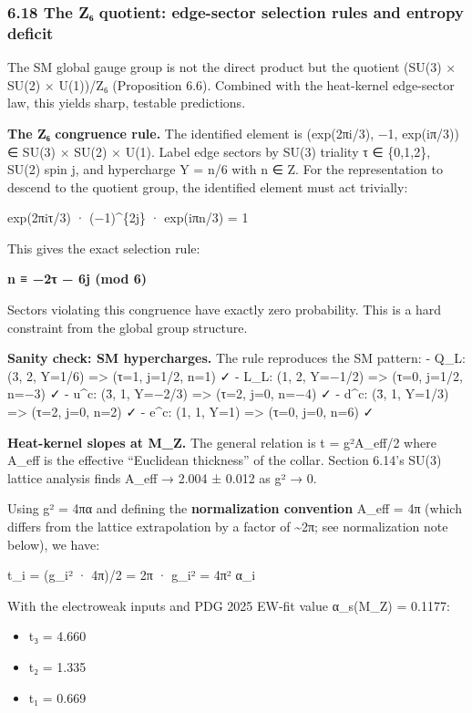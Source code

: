 \documentclass[
]{article}
\providecommand{\tightlist}{%
  \setlength{\itemsep}{0pt}\setlength{\parskip}{0pt}}
\begin{document}
\subsubsection{6.18 The Z₆ quotient: edge-sector selection rules and
entropy
deficit}\label{the-zux2086-quotient-edge-sector-selection-rules-and-entropy-deficit}

The SM global gauge group is not the direct product but the quotient
(SU(3) × SU(2) × U(1))/Z₆ (Proposition 6.6). Combined with the
heat-kernel edge-sector law, this yields sharp, testable predictions.

\textbf{The Z₆ congruence rule.} The identified element is (exp(2πi/3),
−1, exp(iπ/3)) ∈ SU(3) × SU(2) × U(1). Label edge sectors by SU(3)
triality τ ∈ \{0,1,2\}, SU(2) spin j, and hypercharge Y = n/6 with n ∈
Z. For the representation to descend to the quotient group, the
identified element must act trivially:

exp(2πiτ/3) · (−1)\^{}\{2j\} · exp(iπn/3) = 1

This gives the exact selection rule:

\textbf{n ≡ −2τ − 6j (mod 6)}

Sectors violating this congruence have exactly zero probability. This is
a hard constraint from the global group structure.

\textbf{Sanity check: SM hypercharges.} The rule reproduces the SM
pattern: - Q\_L: (3, 2, Y=1/6) =\textgreater{} (τ=1, j=1/2, n=1) ✓ -
L\_L: (1, 2, Y=−1/2) =\textgreater{} (τ=0, j=1/2, n=−3) ✓ - u\^{}c: (3̄,
1, Y=−2/3) =\textgreater{} (τ=2, j=0, n=−4) ✓ - d\^{}c: (3̄, 1, Y=1/3)
=\textgreater{} (τ=2, j=0, n=2) ✓ - e\^{}c: (1, 1, Y=1) =\textgreater{}
(τ=0, j=0, n=6) ✓

\textbf{Heat-kernel slopes at M\_Z.} The general relation is t =
g²A\_eff/2 where A\_eff is the effective ``Euclidean thickness'' of the
collar. Section 6.14's SU(3) lattice analysis finds A\_eff → 2.004 ±
0.012 as g² → 0.

Using g² = 4πα and defining the \textbf{normalization convention} A\_eff
= 4π (which differs from the lattice extrapolation by a factor of
\textasciitilde2π; see normalization note below), we have:

t\_i = (g\_i² · 4π)/2 = 2π · g\_i² = 4π² α\_i

With the electroweak inputs and PDG 2025 EW-fit value α\_s(M\_Z) =
0.1177:

\begin{itemize}
\tightlist
\item
  t₃ = 4.660
\item
  t₂ = 1.335
\item
  t₁ = 0.669
\end{itemize}
\end{document}
